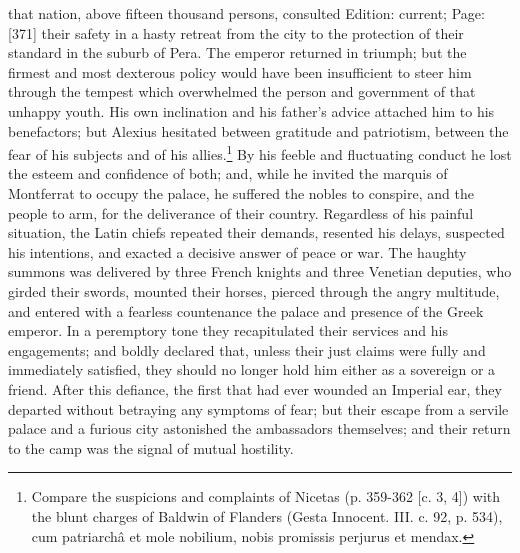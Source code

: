 that nation, above fifteen thousand persons, consulted Edition: current; Page: [371] their safety in a hasty retreat from the city to the protection of their standard in the suburb of Pera. The emperor returned in triumph; but the firmest and most dexterous policy would have been insufficient to steer him through the tempest which overwhelmed the person and government of that unhappy youth. His own inclination and his father\texthebrew{}’s advice attached him to his benefactors; but Alexius hesitated between gratitude and patriotism, between the fear of his subjects and of his allies.\footnote{Compare the suspicions and complaints of Nicetas (p. 359-362 [c. 3, 4]) with the blunt charges of Baldwin of Flanders (Gesta Innocent. III. c. 92, p. 534), cum patriarchâ et mole nobilium, nobis promissis perjurus et mendax.} By his feeble and fluctuating conduct he lost the esteem and confidence of both; and, while he invited the marquis of Montferrat to occupy the palace, he suffered the nobles to conspire, and the people to arm, for the deliverance of their country. Regardless of his painful situation, the Latin chiefs repeated their demands, resented his delays, suspected his intentions, and exacted a decisive answer of peace or war. The haughty summons was delivered by three French knights and three Venetian deputies, who girded their swords, mounted their horses, pierced through the angry multitude, and entered with a fearless countenance the palace and presence of the Greek emperor. In a peremptory tone they recapitulated their services and his engagements; and boldly declared that, unless their just claims were fully and immediately satisfied, they should no longer hold him either as a sovereign or a friend. After this defiance, the first that had ever wounded an Imperial ear, they departed without betraying any symptoms of fear; but their escape from a servile palace and a furious city astonished the ambassadors themselves; and their return to the camp was the signal of mutual hostility.

